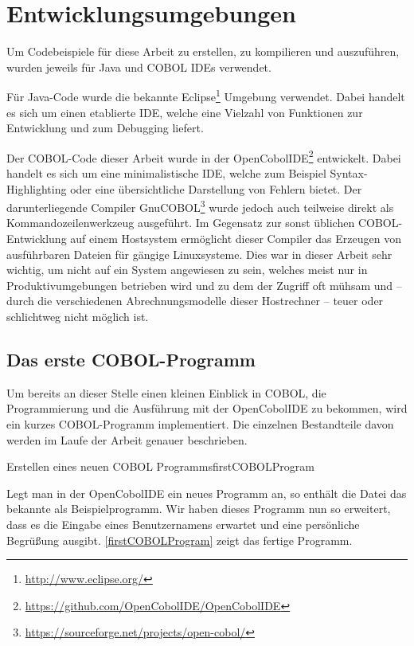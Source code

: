 \section{Entwicklungsumgebungen}
Um Codebeispiele für diese Arbeit zu erstellen, zu kompilieren und auszuführen, wurden jeweils für Java und COBOL IDEs verwendet.

Für Java-Code wurde die bekannte Eclipse\footnote{\url{http://www.eclipse.org/} \visitedOn} Umgebung verwendet. Dabei handelt es sich um einen etablierte IDE, welche eine Vielzahl von Funktionen zur Entwicklung und zum Debugging liefert.

Der COBOL-Code dieser Arbeit wurde in der OpenCobolIDE\footnote{\url{https://github.com/OpenCobolIDE/OpenCobolIDE} \visitedOn} entwickelt. Dabei handelt es sich um eine minimalistische IDE, welche zum Beispiel Syntax-Highlighting oder eine übersichtliche Darstellung von Fehlern bietet. Der darunterliegende Compiler GnuCOBOL\footnote{\url{https://sourceforge.net/projects/open-cobol/} \visitedOn} wurde jedoch auch teilweise direkt als Kommandozeilenwerkzeug ausgeführt. Im Gegensatz zur sonst üblichen COBOL-Entwicklung auf einem Hostsystem ermöglicht dieser Compiler das Erzeugen von ausführbaren Dateien für gängige Linuxsysteme. Dies war in dieser Arbeit sehr wichtig, um nicht auf ein System angewiesen zu sein, welches meist nur in Produktivumgebungen betrieben wird und zu dem der Zugriff oft mühsam und -- durch die verschiedenen Abrechnungsmodelle dieser Hostrechner -- teuer oder schlichtweg nicht möglich ist.

\subsection*{Das erste COBOL-Programm}

Um bereits an dieser Stelle einen kleinen Einblick in COBOL, die Programmierung und die Ausführung mit der OpenCobolIDE zu bekommen, wird ein kurzes COBOL-Programm implementiert. Die einzelnen Bestandteile davon werden im Laufe der Arbeit genauer beschrieben.

\begin{codeWithCaption}{Erstellen eines neuen COBOL Programms}{firstCOBOLProgram}
\end{codeWithCaption}

Legt man in der OpenCobolIDE ein neues Programm an, so enthält die Datei das bekannte  als Beispielprogramm. Wir haben dieses Programm nun so erweitert, dass es die Eingabe eines Benutzernamens erwartet und eine persönliche Begrüßung ausgibt. \autoref{firstCOBOLProgram} zeigt das fertige Programm.

